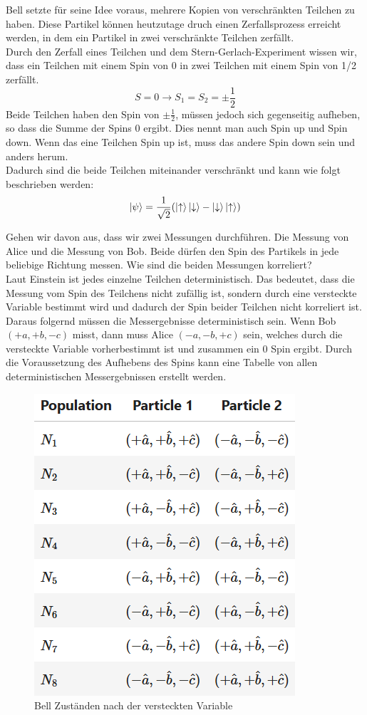Bell setzte für seine Idee voraus, mehrere Kopien von verschränkten Teilchen zu haben. Diese Partikel können heutzutage druch einen Zerfallsprozess erreicht werden, in dem ein Partikel in zwei verschränkte Teilchen zerfällt.\\

Durch den Zerfall eines Teilchen und dem Stern-Gerlach-Experiment wissen wir, dass ein Teilchen mit einem Spin von 0 in zwei Teilchen mit einem Spin von 1/2 zerfällt.
\begin{equation}
    S = 0 \rightarrow S_1 = S_2 = \pm\frac{1}{2}
\end{equation}
Beide Teilchen haben den Spin von $\pm\frac{1}{2}$, müssen jedoch sich gegenseitig aufheben, so dass die Summe der Spins 0 ergibt.
Dies nennt man auch Spin up und Spin down. Wenn das eine Teilchen Spin up ist, muss das andere Spin down sein und anders herum.\\
Dadurch sind die beide Teilchen miteinander verschränkt und kann wie folgt beschrieben werden:
\begin{equation}
    \ket{\psi} = \frac{1}{\sqrt{2}}(\ket{\uparrow}\ket{\downarrow} - \ket{\downarrow}\ket{\uparrow})
\end{equation}

Gehen wir davon aus, dass wir zwei Messungen durchführen. Die Messung von Alice und die Messung von Bob.
Beide dürfen den Spin des Partikels in jede beliebige Richtung messen. Wie sind die beiden Messungen korreliert?\\
Laut Einstein ist jedes einzelne Teilchen deterministisch. Das bedeutet, dass die Messung vom Spin des Teilchens nicht zufällig ist, sondern durch eine versteckte Variable bestimmt wird und dadurch der Spin beider Teilchen nicht korreliert ist.\\
Daraus folgernd müssen die Messergebnisse deterministisch sein. Wenn Bob $(+a, +b, -c)$ misst, dann muss Alice $(-a, -b, +c)$ sein, welches durch die versteckte Variable vorherbestimmt ist und zusammen ein 0 Spin ergibt.
Durch die Voraussetzung des Aufhebens des Spins kann eine Tabelle von allen deterministischen Messergebnissen erstellt werden.

\begin{figure}[H]
    \centering
    \includegraphics[width=0.5\linewidth]{img/BellList.png}
    \caption{Bell Zuständen nach der versteckten Variable}
    \label{fig:BellList}
\end{figure}

